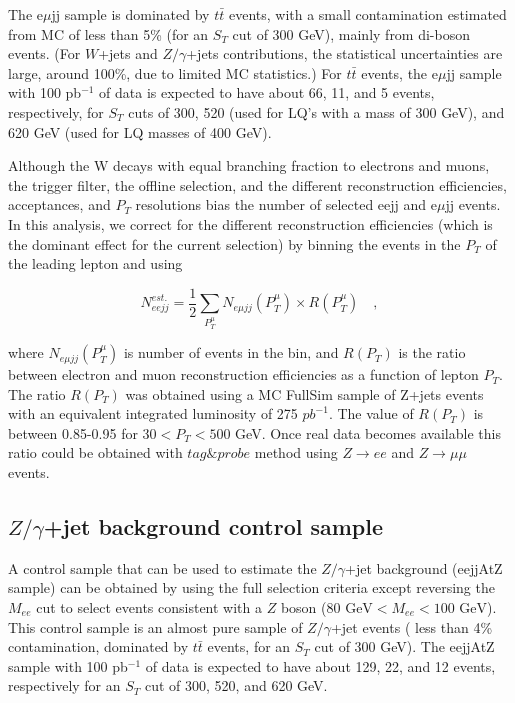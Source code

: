 \documentclass{cmspaper}
\begin{document}
\begin{linenumbers}
The e$\mu$jj sample is dominated by $t\bar{t}$ events, 
with a small contamination estimated from MC of less than 5\% (for an 
$S_{T}$ cut of 300 GeV), 
mainly from di-boson events. (For $W$+jets and $Z/\gamma$+jets 
contributions, the statistical 
uncertainties are large, around 100\%, due to limited MC statistics.) 
For $t\bar{t}$ events, the e$\mu$jj sample with 100 pb$^{-1}$ of data 
is expected to have about 66, 11, and 5 events, respectively, 
for $S_{T}$ cuts of 300, 520 (used for LQ's with a mass of
300 GeV), and 620 GeV (used for LQ masses of 400 GeV).

Although the W decays with equal branching fraction to electrons and muons,
the trigger filter, the offline selection, and the 
different reconstruction efficiencies,
acceptances, and $P_{T}$ resolutions  bias the number of selected eejj 
and e$\mu$jj events. 
In this analysis, we correct for the different reconstruction efficiencies
(which is the dominant effect for the current selection) by
binning the events in the $P_T$ of the leading lepton and using

\begin{equation} \label{formula:NeejFromNemujj}
N_{eejj}^{est.} = \frac{1}{2}\sum_{P_{T}^{\mu}} N_{e\mu jj}(P_{T}^{\mu}) \times R(P_{T}^{\mu}) \quad , 
\end{equation}

where $N_{e\mu jj}(P_{T}^{\mu})$ is number of events in the bin, 
and $R(P_{T})$ is the ratio between electron 
and muon reconstruction efficiencies as a function of lepton $P_{T}$. 
The ratio $R(P_{T})$ was obtained 
using a MC FullSim sample of Z+jets 
events with an equivalent integrated luminosity of 275 $pb^{-1}$.
The value of $R(P_{T})$ is between 0.85-0.95 for $30 < P_{T} < 500$ GeV.
Once real data becomes available this ratio could be obtained with $tag\&probe$ method using $Z \rightarrow ee$ and 
$Z \rightarrow \mu\mu$ events.

\subsection{$Z/\gamma$+jet background control sample} \label{sec:ZcontrolSample}

A control sample that can be used to
estimate the $Z/\gamma$+jet background (eejjAtZ sample) 
can be obtained by using the full selection criteria except reversing 
the $M_{ee}$ cut to select events consistent with a $Z$ boson
($80\mbox{ GeV} < M_{ee} < 100\mbox{ GeV}$). 
This control sample is an almost pure sample of  
$Z/\gamma$+jet events 
( less than 4\% contamination, dominated by $t\bar{t}$ events, 
for an $S_{T}$ cut of 300 GeV). 
The eejjAtZ sample with 100 pb$^{-1}$ of data 
is expected to have about 129, 22, and 12 events, respectively for an $S_{T}$ cut of 300, 520, and 620 GeV.


\end{linenumbers}
\end{document}
